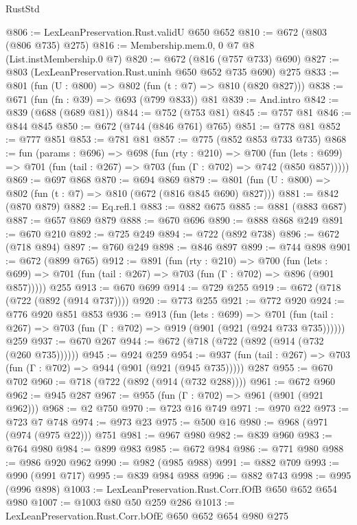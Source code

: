 \begin{lexlean}{RustStd}
\begin{coremodule}
@806 := LexLeanPreservation.Rust.validU @650 @652
@810 := @672 (@803 (@806 @735) @275)
@816 := Membership.mem.{0, 0} @7 @8 (List.instMembership.{0} @7)
@820 := @672 (@816 (@757 @733) @690)
@827 := @803 (LexLeanPreservation.Rust.uninh @650 @652 @735 @690) @275
@833 := @801 (fun (U : @800) => @802 (fun (t : @7) => @810 (@820 @827)))
@838 := @671 (fun (fn : @39) => @693 (@799 @833)) @81
@839 := And.intro
@842 := @839 (@688 (@689 @81))
@844 := @752 (@753 @81)
@845 := @757 @81
@846 := @844 @845
@850 := @672 (@744 (@846 @761) @765)
@851 := @778 @81
@852 := @777 @851
@853 := @781 @81
@857 := @775 (@852 @853 @733 @735)
@868 := fun (params : @696) =>
  @698
    (fun (rty : @210) =>
    @700
      (fun (lets : @699) => @701 (fun (tail : @267) => @703 (fun (Γ : @702) => @742 (@850 @857)))))
@869 := @697 @868
@870 := @694 @869
@879 := @801 (fun (U : @800) => @802 (fun (t : @7) => @810 (@672 (@816 @845 @690) @827)))
@881 := @842 (@870 @879)
@882 := Eq.refl.{1}
@883 := @882 @675
@885 := @881 (@883 @687)
@887 := @657 @869 @879
@888 := @670 @696
@890 := @888 @868 @249
@891 := @670 @210
@892 := @725 @249
@894 := @722 (@892 @738)
@896 := @672 (@718 @894)
@897 := @760 @249
@898 := @846 @897
@899 := @744 @898
@901 := @672 (@899 @765)
@912 := @891
    (fun (rty : @210) =>
    @700
      (fun (lets : @699) => @701 (fun (tail : @267) => @703 (fun (Γ : @702) => @896 (@901 @857)))))
    @255
@913 := @670 @699
@914 := @729 @255
@919 := @672 (@718 (@722 (@892 (@914 @737))))
@920 := @773 @255
@921 := @772 @920
@924 := @776 @920 @851 @853
@936 := @913
    (fun (lets : @699) =>
    @701 (fun (tail : @267) => @703 (fun (Γ : @702) => @919 (@901 (@921 (@924 @733 @735))))))
    @259
@937 := @670 @267
@944 := @672 (@718 (@722 (@892 (@914 (@732 (@260 @735))))))
@945 := @924 @259
@954 := @937 (fun (tail : @267) => @703 (fun (Γ : @702) => @944 (@901 (@921 (@945 @735))))) @287
@955 := @670 @702
@960 := @718 (@722 (@892 (@914 (@732 @288))))
@961 := @672 @960
@962 := @945 @287
@967 := @955 (fun (Γ : @702) => @961 (@901 (@921 @962)))
@968 := @2 @750
@970 := @723 @16 @749
@971 := @970 @22
@973 := @723 @7 @748
@974 := @973 @23
@975 := @500 @16
@980 := @968 (@971 (@974 (@975 @22))) @751
@981 := @967 @980
@982 := @839 @960
@983 := @764 @980
@984 := @899 @983
@985 := @672 @984
@986 := @771 @980
@988 := @986 @920 @962
@990 := @982 (@985 @988)
@991 := @882 @709
@993 := @990 (@991 @717)
@995 := @839 @984 @988
@996 := @882 @743
@998 := @995 (@996 @898)
@1003 := LexLeanPreservation.Rust.Corr.fOfB @650 @652 @654 @980
@1007 := @1003 @80 @50 @259 @286
@1013 := LexLeanPreservation.Rust.Corr.bOfE @650 @652 @654 @980 @275

\end{coremodule}
\end{lexlean}
